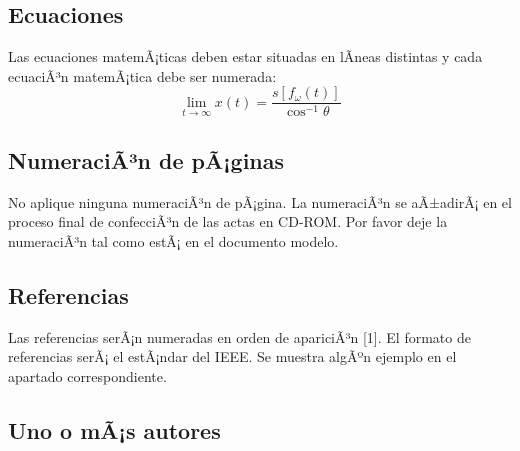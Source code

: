 \documentclass[10pt,conference,a4paper]{IEEEtran}
\begin{document}


\subsection{Ecuaciones}

Las ecuaciones matemÃ¡ticas deben estar situadas en lÃ­neas distintas y cada
ecuaciÃ³n matemÃ¡tica debe ser numerada:
\begin{equation}
    \underset{t\rightarrow\infty}{\lim}x(t)=\frac{s[f_{\omega}(t)]}{\cos
    ^{-1}\theta}
\end{equation}

\subsection{NumeraciÃ³n de pÃ¡ginas}

No aplique ninguna numeraciÃ³n de pÃ¡gina. La numeraciÃ³n se aÃ±adirÃ¡ en el
proceso final de confecciÃ³n de las actas en CD-ROM. Por favor deje la
numeraciÃ³n tal como estÃ¡ en el documento modelo.

\subsection{Referencias}

Las referencias serÃ¡n numeradas en orden de apariciÃ³n [1]. El formato de
referencias serÃ¡ el estÃ¡ndar del IEEE. Se muestra algÃºn ejemplo en el apartado correspondiente.

\subsection{Uno o mÃ¡s autores}
\end{document}
